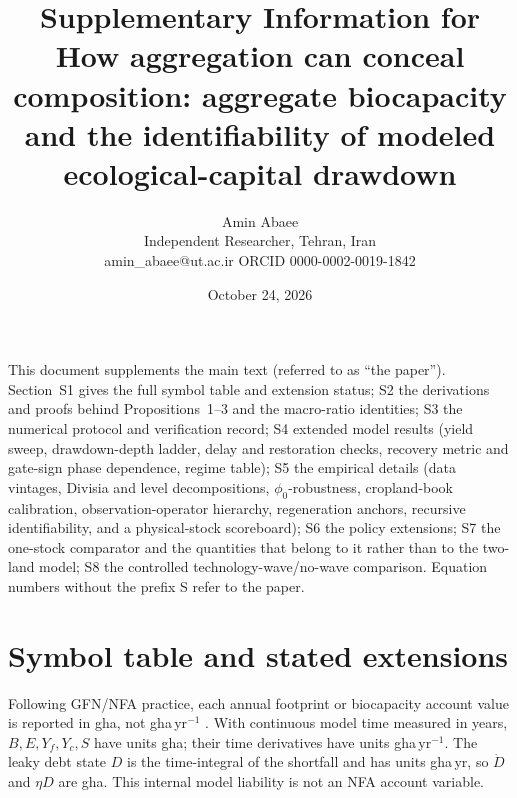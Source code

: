 \documentclass[11pt,a4paper]{article}
\title{Supplementary Information for\\[4pt]
\large How aggregation can conceal composition: aggregate biocapacity and the identifiability of modeled ecological-capital drawdown}
\author{Amin Abaee\\ \small Independent Researcher, Tehran, Iran\\ \small amin\_abaee@ut.ac.ir \quad ORCID 0000-0002-0019-1842}
\date{October 24, 2026}
\begin{document}
\maketitle

\noindent This document supplements the main text (referred to as ``the paper''). Section~S1 gives the full symbol table and extension status; S2 the derivations and proofs behind Propositions~1--3 and the macro-ratio identities; S3 the numerical protocol and verification record; S4 extended model results (yield sweep, drawdown-depth ladder, delay and restoration checks, recovery metric and gate-sign phase dependence, regime table); S5 the empirical details (data vintages, Divisia and level decompositions, $\phi_0$-robustness, cropland-book calibration, observation-operator hierarchy, regeneration anchors, recursive identifiability, and a physical-stock scoreboard); S6 the policy extensions; S7 the one-stock comparator and the quantities that belong to it rather than to the two-land model; S8 the controlled technology-wave/no-wave comparison. Equation numbers without the prefix S refer to the paper.

\tableofcontents

\section{Symbol table and stated extensions}\label{si:symbols}

Following GFN/NFA practice, each annual footprint or biocapacity account value is reported in gha, not gha\,yr$^{-1}$ \citep{GFNStandards2009,GFNGuidebook2019}. With continuous model time measured in years, $B,E,Y_f,Y_c,S$ have units gha; their time derivatives have units gha\,yr$^{-1}$. The leaky debt state $D$ is the time-integral of the shortfall and has units gha\,yr, so $\dot D$ and $\eta D$ are gha. This internal model liability is not an NFA account variable.
\end{document}

